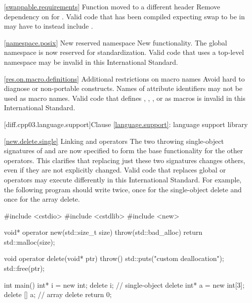 \ref{swappable.requirements}
\effect Function  moved to a different header
\rationale Remove dependency on  for .
\effect Valid \CppIII code that has been compiled expecting swap to be in
 may have to instead include .

\ref{namespace.posix}
\change New reserved namespace
\rationale New functionality.
\effect
The global namespace  is now reserved for standardization. Valid
\CppIII code that uses a top-level namespace  may be invalid in
this International Standard.

\ref{res.on.macro.definitions}
\change Additional restrictions on macro names
\rationale Avoid hard to diagnose or non-portable constructs.
\effect
Names of attribute identifiers may not be used as macro names. Valid  code that defines , ,
, or  as macros is invalid in this
International Standard.

[diff.cpp03.language.support]{Clause \ref{language.support}:
language support library}

\ref{new.delete.single}
\change Linking  and  operators
\rationale The two throwing single-object signatures of  and
 are now specified to form the base functionality for
the other operators. This clarifies that replacing just these two signatures
changes others, even if they are not explicitly changed.
\effect
Valid \CppIII code that replaces global  or 
operators may execute differently in this International Standard. For
example, the following program should write  twice,
once for the single-object delete and once for the array delete.

\begin{codeblock}
#include <cstdio>
#include <cstdlib>
#include <new>

void* operator new(std::size_t size) throw(std::bad_alloc) {
  return std::malloc(size);
}

void operator delete(void* ptr) throw() {
  std::puts("custom deallocation");
  std::free(ptr);
}

int main() {
  int* i = new int;
  delete i;                     // single-object delete
  int* a = new int[3];
  delete [] a;                  // array delete
  return 0;
}
\end{codeblock}

